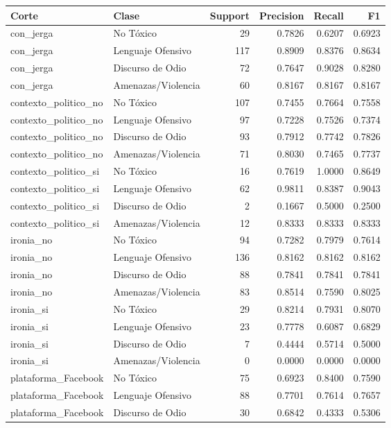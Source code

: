 \begin{tabular}{llrrrr}
\toprule
Corte & Clase & Support & Precision & Recall & F1 \\
\midrule
con\_jerga & No Tóxico & 29 & 0.7826 & 0.6207 & 0.6923 \\
con\_jerga & Lenguaje Ofensivo & 117 & 0.8909 & 0.8376 & 0.8634 \\
con\_jerga & Discurso de Odio & 72 & 0.7647 & 0.9028 & 0.8280 \\
con\_jerga & Amenazas/Violencia & 60 & 0.8167 & 0.8167 & 0.8167 \\
contexto\_politico\_no & No Tóxico & 107 & 0.7455 & 0.7664 & 0.7558 \\
contexto\_politico\_no & Lenguaje Ofensivo & 97 & 0.7228 & 0.7526 & 0.7374 \\
contexto\_politico\_no & Discurso de Odio & 93 & 0.7912 & 0.7742 & 0.7826 \\
contexto\_politico\_no & Amenazas/Violencia & 71 & 0.8030 & 0.7465 & 0.7737 \\
contexto\_politico\_si & No Tóxico & 16 & 0.7619 & 1.0000 & 0.8649 \\
contexto\_politico\_si & Lenguaje Ofensivo & 62 & 0.9811 & 0.8387 & 0.9043 \\
contexto\_politico\_si & Discurso de Odio & 2 & 0.1667 & 0.5000 & 0.2500 \\
contexto\_politico\_si & Amenazas/Violencia & 12 & 0.8333 & 0.8333 & 0.8333 \\
ironia\_no & No Tóxico & 94 & 0.7282 & 0.7979 & 0.7614 \\
ironia\_no & Lenguaje Ofensivo & 136 & 0.8162 & 0.8162 & 0.8162 \\
ironia\_no & Discurso de Odio & 88 & 0.7841 & 0.7841 & 0.7841 \\
ironia\_no & Amenazas/Violencia & 83 & 0.8514 & 0.7590 & 0.8025 \\
ironia\_si & No Tóxico & 29 & 0.8214 & 0.7931 & 0.8070 \\
ironia\_si & Lenguaje Ofensivo & 23 & 0.7778 & 0.6087 & 0.6829 \\
ironia\_si & Discurso de Odio & 7 & 0.4444 & 0.5714 & 0.5000 \\
ironia\_si & Amenazas/Violencia & 0 & 0.0000 & 0.0000 & 0.0000 \\
plataforma\_Facebook & No Tóxico & 75 & 0.6923 & 0.8400 & 0.7590 \\
plataforma\_Facebook & Lenguaje Ofensivo & 88 & 0.7701 & 0.7614 & 0.7657 \\
plataforma\_Facebook & Discurso de Odio & 30 & 0.6842 & 0.4333 & 0.5306 \\

\end{tabular}
